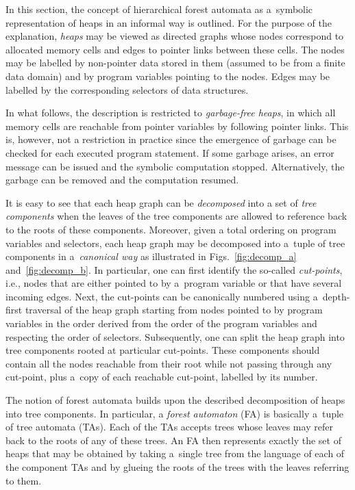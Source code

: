 In this section, the concept of hierarchical
forest automata as a~symbolic representation of heaps in an informal way is outlined. For
the purpose of the explanation, \emph{heaps} may be viewed as directed graphs
whose nodes correspond to allocated memory cells and edges to pointer links
between these cells. The nodes may be labelled by non-pointer data stored in
them (assumed to be from a finite data domain) and by program variables pointing
to the nodes. Edges may be labelled by the corresponding selectors of data
structures.

In what follows, the description is restricted to \emph{garbage-free heaps}, in which all
memory cells are reachable from pointer variables by following pointer links.
This is, however, not a restriction in practice since the emergence of garbage
can be checked for each executed program statement. If some garbage arises, an
error message can be issued and the symbolic computation stopped. Alternatively, the
garbage can be removed and the computation resumed.

It is easy to see that each heap graph can be \emph{decomposed} into a set of
\emph{tree components} when the leaves of the tree components are allowed to
reference back to the roots of these components. Moreover, given a total
ordering on program variables and selectors, each heap graph may be decomposed
into a~tuple of tree components in a~\emph{canonical way} as illustrated in
Figs.~\ref{fig:decomp_a} and~\ref{fig:decomp_b}. In particular, one can first identify
the so-called \emph{cut-points}, i.e., nodes that are either pointed to by
a~program variable or that have several incoming edges. Next, the cut-points can
be canonically numbered using a~depth-first traversal of the heap graph starting
from nodes pointed to by program variables in the order derived from the order
of the program variables and respecting the order of selectors. Subsequently,
one can split the heap graph into tree components rooted at particular
cut-points. These components should contain all the nodes reachable from their
root while not passing through any cut-point, plus a~copy of each reachable
cut-point, labelled by its number. 

The notion of forest automata builds upon the described decomposition of heaps
into tree components. In particular, a \emph{forest automaton} (FA) is basically
a~tuple of tree automata (TAs). Each of the TAs accepts trees whose
leaves may refer back to the roots of any of these trees. An FA then represents
exactly the set of heaps that may be obtained by taking a~single tree from the
language of each of the component TAs and by glueing the roots of the trees with
the leaves referring to them.

